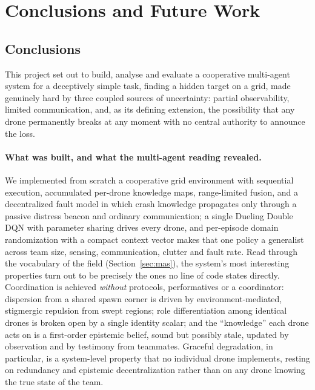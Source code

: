 \section{Conclusions and Future Work}
\label{sec:conclusions}

\subsection{Conclusions}
\label{subsec:conc-conclusions}

This project set out to build, analyse and evaluate a cooperative multi-agent
system for a deceptively simple task, finding a hidden target on a grid, made
genuinely hard by three coupled sources of uncertainty: partial observability,
limited communication, and, as its defining extension, the possibility that any
drone permanently breaks at any moment with no central authority to announce the
loss.

\paragraph{What was built, and what the multi-agent reading revealed.}
We implemented from scratch a cooperative grid environment with sequential
execution, accumulated per-drone knowledge maps, range-limited fusion, and a
decentralized fault model in which crash knowledge propagates only through a
passive distress beacon and ordinary communication; a single Dueling Double DQN
with parameter sharing drives every drone, and per-episode domain randomization
with a compact context vector makes that one policy a generalist across team
size, sensing, communication, clutter and fault rate. Read through the vocabulary
of the field (Section~\ref{sec:mas}), the system's most interesting properties
turn out to be precisely the ones no line of code states directly. Coordination
is achieved \emph{without} protocols, performatives or a coordinator: dispersion
from a shared spawn corner is driven by environment-mediated, stigmergic
repulsion from swept regions; role differentiation among identical drones is
broken open by a single identity scalar; and the ``knowledge'' each drone acts on
is a first-order epistemic belief, sound but possibly stale, updated by
observation and by testimony from teammates. Graceful degradation, in particular,
is a system-level property that no individual drone implements, resting on
redundancy and epistemic decentralization rather than on any drone knowing the
true state of the team.

